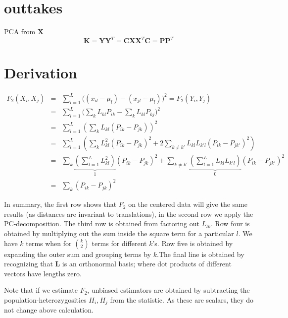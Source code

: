 \documentclass[10pt,a4paper]{article}
\newcommand{\MX}{\mathbf{X}} %
\newcommand{\MC}{\mathbf{C}} %
\newcommand{\MY}{\mathbf{Y}} %
\newcommand{\MP}{\mathbf{P}} %
\newcommand{\ML}{\mathbf{L}} %
\newcommand{\MK}{\mathbf{K}} %
\begin{document}
	
	\section{outtakes}
	PCA from $\MX$
	\begin{equation}
	\MK = \MY \MY^T = \MC\MX\MX^T \MC = \MP\MP^T
	\end{equation}

\appendix
\section{Derivation}
\begin{eqnarray}
F_2(X_i, X_j) &=& \sum_{l=1}^L \big( (x_{il} - \mu_l) -(x_{jl} -\mu_l)\big)^2 = F_2(Y_i, Y_j)\nonumber\\
&=& \sum_{l=1}^L \big( \sum_k L_{kl}P_{ik} - \sum_kL_{kl}P_{kj}\big)^2\nonumber\\
&=& \sum_{l=1}^L \left( \sum_k L_{kl} (P_{ik} -P_{jk}) \right)^2\nonumber\\
&=& \sum_{l=1}^L \left( \sum_k L_{kl}^2 (P_{ik} -P_{jk})^2 + 2\sum_{k\neq k'} L_{kl}L_{k'l}(P_{ik} - P_{jk'})^2 \right)\nonumber\\
&=& \sum_k \underbrace{\left(\sum_{l=1}^L L_{kl}^2\right)}_1 (P_{ik} -P_{jk})^2 + \sum_{k\neq k'}\underbrace{\left(\sum_{l=1}^L L_{kl}L_{k'l}\right)}_{0} (P_{ik} - P_{jk'})^2\nonumber\\
&=& \sum_k (P_{ik} - P_{jk})^2
\end{eqnarray}

In summary, the first row shows that $F_2$ on the centered data will give the same results (as distances are invariant to translations), in the second row we apply the PC-decomposition. The third row is obtained from factoring out $L_{lk}$. Row four is obtained by multiplying out the sum inside the square term for a particular $l$. We have $k$ terms when for $\binom{k}{2}$ terms for different $k$'s.  Row five is obtained by expanding the outer sum and grouping terms by $k$.The final line is obtained by recognizing that $\ML$ is an orthonormal basis; where dot products of different vectors have lengths zero.

Note that if we estimate $F_2$, unbiased estimators are obtained by subtracting the population-heterozygosities $H_i, H_j$ from the statistic. As these are scalars, they do not change above calculation.

\end{document}
